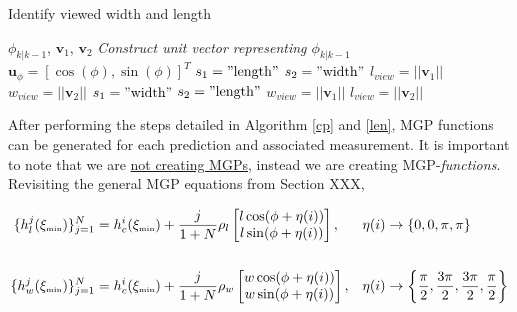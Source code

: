 \begin{algorithm}[H]
\caption{Identify viewed width and length}\label{len}
\begin{algorithmic}
\Input $\phi_{k|k-1}$, $\mathbf{v}_1$, $\mathbf{v}_2$
\State \textit{Construct unit vector representing $\phi_{k|k-1}$}
\State $\mathbf{u}_{\phi} = [\cos(\phi), \sin(\phi)]^T$
\State $s_1 = "\text{length}"$
\State $s_2 = "\text{width}"$
\State $l_{view} = ||\mathbf{v}_1||$
\State $w_{view} = ||\mathbf{v}_2||$
\Else
\State $s_1 = "\text{width}"$
\State $s_2 = "\text{length}"$
\State $w_{view} = ||\mathbf{v}_1||$
\State $l_{view} = ||\mathbf{v}_2||$
\EndIf
{}
\end{algorithmic}
\end{algorithm}

After performing the steps detailed in Algorithm \ref{cp} and \ref{len}, MGP functions can be generated for each prediction and associated measurement. It is important to note that we are \underline{not creating MGPs}, instead we are creating MGP-\textit{functions}. Revisiting the general MGP equations from Section XXX, 

\begin{align}
    \{h_{l}^j(\xi_{\text{\tiny{min}}})\}_{j = 1}^{N} &= h_c^i(\xi_{\text{\tiny{min}}}) + \frac{j}{1+N}\rho_l
        \begin{bmatrix}
            l\cos(\phi + \eta(i)) \\
            l\sin(\phi + \eta(i)) 
        \end{bmatrix}, & \eta(i) &\rightarrow \{0,0,\pi,\pi\} 
    \\\nonumber 
    \\ 
    \{h_{w}^j(\xi_{\text{\tiny{min}}})\}_{j = 1}^{N} &= h_c^i(\xi_{\text{\tiny{min}}}) + \frac{j}{1+N}\rho_w
    \begin{bmatrix}
        w\cos(\phi + \eta(i)) \\
        w\sin(\phi + \eta(i)) 
    \end{bmatrix}, & \eta(i) &\rightarrow \left\{\frac{\pi}{2},\frac{3\pi}{2},\frac{3\pi}{2},\frac{\pi}{2}\right\} 
\end{align}

